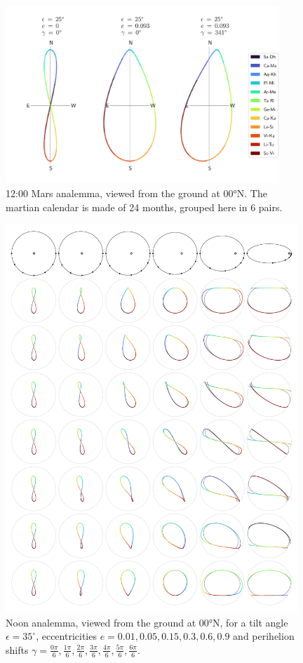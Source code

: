 \documentclass[12pt]{article}
\begin{document}
\begin{figure}
    \centering
    \includegraphics[width=0.92\textwidth]{./comparisonMars.pdf}
    \caption{
        12:00 Mars analemma, viewed from the ground at 00°N. The martian 
        calendar is made of 24 months, grouped here in 6 pairs.
    }
    \label{fig:comparisonMars}
\end{figure}

\begin{figure}
    \centering
    \includegraphics[width=0.98\textwidth]{./mosaic.pdf}
    \caption{
        Noon analemma, viewed from the ground at 00°N, for a tilt angle $\epsilon=35^\circ$, 
        eccentricities $e=0.01, 0.05, 0.15, 0.3, 0.6, 0.9$ and perihelion shifts 
        $\gamma=\tfrac{0\pi}{6},\tfrac{1\pi}{6},\tfrac{2\pi}{6},\tfrac{3\pi}{6},
        \tfrac{4\pi}{6},\tfrac{5\pi}{6},\tfrac{6\pi}{6}$.
    }
    \label{fig:mosaic}
\end{figure}
\end{document}
